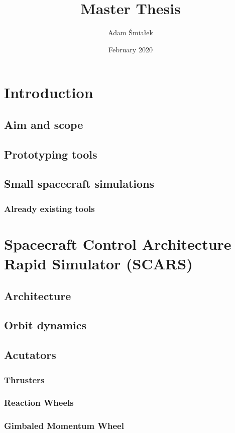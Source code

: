 \documentclass{article}
\title{Master Thesis}
\author{Adam Śmiałek}
\date{February 2020}
\begin{document}
\makeatletter
\renewcommand\@dotsep{240}   %
\makeatother
\tableofcontents
\clearpage



\section{Introduction}
\subsection{Aim and scope}
\subsection{Prototyping tools}
\subsection{Small spacecraft simulations}
\subsubsection{Already existing tools}
\section{Spacecraft Control Architecture Rapid Simulator (SCARS)}
\subsection{Architecture}
\subsection{Orbit dynamics}
\subsection{Acutators}
\subsubsection{Thrusters}
\subsubsection{Reaction Wheels}
\subsubsection{Gimbaled Momentum Wheel}
\end{document}
